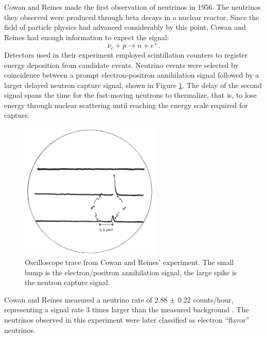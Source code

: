 Cowan and Reines made the first observation of neutrinos in 1956.  The
neutrinos they observed were produced through beta decays in a nuclear
reactor.  Since the field of particle physics had advanced considerably by this
point, Cowan and Reines had enough information to expect the signal:
\begin{equation} \label{beta} \bar{\nu}_e + p \rightarrow n + e^+.  \end{equation}
Detectors used in their experiment employed scintillation counters to register
energy deposition from candidate events.  Neutrino events were selected by
coincidence between a prompt electron-positron annihilation signal followed by
a larger delayed neutron capture signal, shown in Figure \ref{oscilloscope}.
The delay of the second signal spans the time for the fast-moving neutrons to
thermalize, that is, to lose energy through nuclear scattering until reaching
the energy scale required for capture.

\begin{figure}[b!]
  \begin{center}
    \includegraphics[width=0.6\textwidth]{figures/figures/cowanOscilloscope.png}
  \end{center}
  \caption{Oscilloscope trace from Cowan and Reines' experiment.  The small
  bump is the electron/positron annihilation signal, the large spike is the
  neutron capture signal.}
  \label{oscilloscope}
\end{figure}
Cowan and Reines measured a neutrino rate of 2.88 $\pm$ 0.22 counts/hour,
representing a signal rate 3 times larger than the measured background
 \cite{cowan}.
The neutrinos observed in this experiment were later classified as
electron ``flavor''  neutrinos.

